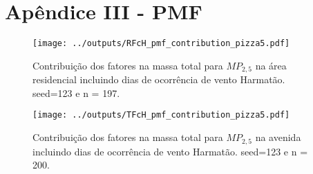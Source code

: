 \section{Apêndice III - PMF}

\begin{landscape}
  \begin{figure}
    \centering
    \begin{minipage}[b]{0.45\linewidth}
      \texttt{[image: ../outputs/RFcH\_pmf\_contribution\_pizza5.pdf]}
      \caption{Contribuição dos fatores na massa total para $MP_{2,5}$ na área
               residencial incluindo dias de ocorrência de vento Harmatão. seed=123 e n = 197.
               \label{table:RFcH_contribution5}}
    \end{minipage}%
    \hspace{0.5cm}
    \begin{minipage}[b]{0.45\linewidth}
      
    \end{minipage}
  \end{figure}
\end{landscape}

\begin{landscape}
  \begin{figure}
    \centering
    \begin{minipage}[b]{0.45\linewidth}
      \texttt{[image: ../outputs/TFcH\_pmf\_contribution\_pizza5.pdf]}
      \caption{Contribuição dos fatores na massa total para $MP_{2,5}$ na avenida
               incluindo dias de ocorrência de vento Harmatão. seed=123 e n = 200.
               \label{table:TFcH_contribution5}}
    \end{minipage}%
    \hspace{0.5cm}
    \begin{minipage}[b]{0.45\linewidth}
      
    \end{minipage}
  \end{figure}
\end{landscape}

